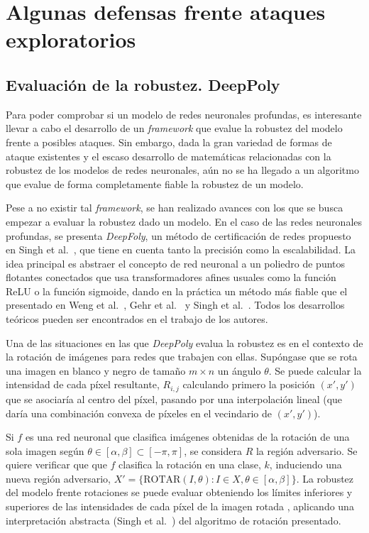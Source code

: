 \section{Algunas defensas frente ataques exploratorios}

\subsection*{Evaluación de la robustez. DeepPoly}

Para poder comprobar si un modelo de redes neuronales profundas, es interesante llevar a cabo el desarrollo de un \textit{framework} que evalue la robustez del modelo frente a posibles ataques. Sin embargo, dada la gran variedad de formas de ataque existentes y el escaso desarrollo de matemáticas relacionadas con la robustez de los modelos de redes neuronales, aún no se ha llegado a un algoritmo que evalue de forma completamente fiable la robustez de un modelo.

Pese a no existir tal \textit{framework}, se han realizado avances con los que se busca empezar a evaluar la robustez dado un modelo. En el caso de las redes neuronales profundas, se presenta \textit{DeepFoly}, un método de certificación de redes propuesto en Singh et al.~\cite{DeepFoly}, que tiene en cuenta tanto la precisión como la escalabilidad. La idea principal es abstraer el concepto de red neuronal a un poliedro de puntos flotantes conectados que usa transformadores afines usuales como la función ReLU o la función sigmoide, dando en la práctica un método más fiable que el presentado en Weng et al.~\cite{Certif1}, Gehr et al.~\cite{Certif2} y Singh et al.~\cite{Certif3}. Todos los desarrollos teóricos pueden ser encontrados en el trabajo de los autores.

Una de las situaciones en las que \textit{DeepPoly} evalua la robustez es en el contexto de la rotación de imágenes para redes que trabajen con ellas. Supóngase que se rota una imagen en blanco y negro de tamaño $m \times n$ un ángulo $\theta$. Se puede calcular la intensidad de cada píxel resultante, $R_{i,j}$ calculando primero la posición $(x',y')$ que se asociaría al centro del píxel, pasando por una interpolación lineal (que daría una combinación convexa de píxeles en el vecindario de $(x',y')$).

Si $f$ es una red neuronal que clasifica imágenes obtenidas de la rotación de una sola imagen según $\theta \in [\alpha, \beta] \subset [- \pi, \pi]$, se considera $R$ la región adversario. Se quiere verificar que que $f$ clasifica la rotación en una clase, $k$, induciendo una nueva región adversario, $X' = \{\text{ROTAR}(I,\theta): I \in X, \theta \in [\alpha, \beta] \}$. La robustez del modelo frente rotaciones se puede evaluar obteniendo los límites inferiores y superiores de las intensidades de cada píxel de la imagen rotada , aplicando una interpretación abstracta (Singh et al.~\cite{DeepFoly}) del algoritmo de rotación presentado.

